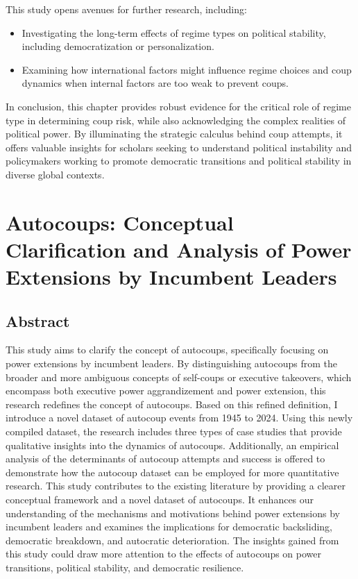 \documentclass[
  12pt,
]{report}
\begin{document}
This study opens avenues for further research, including:

\begin{itemize}
\item
  Investigating the long-term effects of regime types on political
  stability, including democratization or personalization.
\item
  Examining how international factors might influence regime choices and
  coup dynamics when internal factors are too weak to prevent coups.
\end{itemize}

In conclusion, this chapter provides robust evidence for the critical
role of regime type in determining coup risk, while also acknowledging
the complex realities of political power. By illuminating the strategic
calculus behind coup attempts, it offers valuable insights for scholars
seeking to understand political instability and policymakers working to
promote democratic transitions and political stability in diverse global
contexts.

\chapter{Autocoups: Conceptual Clarification and Analysis of Power
Extensions by Incumbent Leaders}\label{sec-chapter3}

\section*{Abstract}\label{abstract-2}

This study aims to clarify the concept of autocoups, specifically
focusing on power extensions by incumbent leaders. By distinguishing
autocoups from the broader and more ambiguous concepts of self-coups or
executive takeovers, which encompass both executive power aggrandizement
and power extension, this research redefines the concept of autocoups.
Based on this refined definition, I introduce a novel dataset of
autocoup events from 1945 to 2024. Using this newly compiled dataset,
the research includes three types of case studies that provide
qualitative insights into the dynamics of autocoups. Additionally, an
empirical analysis of the determinants of autocoup attempts and success
is offered to demonstrate how the autocoup dataset can be employed for
more quantitative research. This study contributes to the existing
literature by providing a clearer conceptual framework and a novel
dataset of autocoups. It enhances our understanding of the mechanisms
and motivations behind power extensions by incumbent leaders and
examines the implications for democratic backsliding, democratic
breakdown, and autocratic deterioration. The insights gained from this
study could draw more attention to the effects of autocoups on power
transitions, political stability, and democratic resilience.
\end{document}
